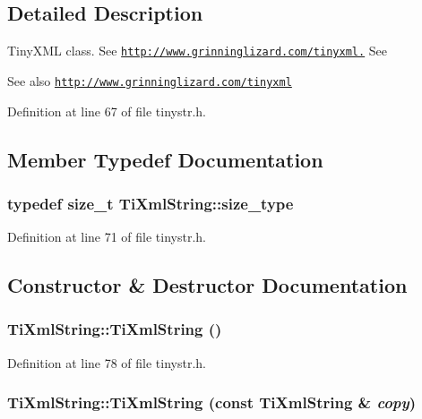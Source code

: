 \subsection{Detailed Description}
TinyXML class. See \href{http://www.grinninglizard.com/tinyxml.}{\tt http://www.grinninglizard.com/tinyxml.} See \begin{DoxySeeAlso}{See also}
\href{http://www.grinninglizard.com/tinyxml}{\tt http://www.grinninglizard.com/tinyxml} 
\end{DoxySeeAlso}


Definition at line 67 of file tinystr.h.

\subsection{Member Typedef Documentation}
\hypertarget{class_ti_xml_string_abeb2c1893a04c17904f7c06546d0b971}{
\subsubsection[{size\_\-type}]{\setlength{\rightskip}{0pt plus 5cm}typedef size\_\-t {\bf TiXmlString::size\_\-type}}}
\label{class_ti_xml_string_abeb2c1893a04c17904f7c06546d0b971}


Definition at line 71 of file tinystr.h.

\subsection{Constructor \& Destructor Documentation}
\hypertarget{class_ti_xml_string_a342f61e0fc2244df300b73aedf6d3fef}{
\subsubsection[{TiXmlString}]{\setlength{\rightskip}{0pt plus 5cm}TiXmlString::TiXmlString ()}}
\label{class_ti_xml_string_a342f61e0fc2244df300b73aedf6d3fef}


Definition at line 78 of file tinystr.h.\hypertarget{class_ti_xml_string_ac80fe17693a438c9ab2591664743fcb6}{
\subsubsection[{TiXmlString}]{\setlength{\rightskip}{0pt plus 5cm}TiXmlString::TiXmlString (const {\bf TiXmlString} \& {\em copy})}}
\label{class_ti_xml_string_ac80fe17693a438c9ab2591664743fcb6}


